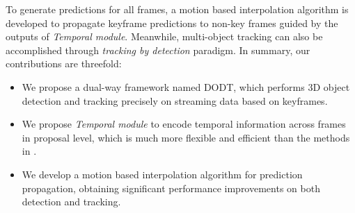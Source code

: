 \documentclass[letterpaper, 10pt, conference]{ieeeconf}  %
\def\figurename{\emph{Figure}}
\begin{document}

To generate predictions for all frames, a motion based interpolation algorithm is developed to propagate keyframe predictions to non-key frames guided by the outputs of \textit{Temporal module}. Meanwhile, multi-object tracking can also be accomplished through \textit{tracking by detection} \cite{lenz2015followme} paradigm. In summary, our contributions are threefold:
\begin{itemize}
	\item We propose a dual-way framework named DODT,  which performs 3D object detection and tracking precisely on streaming data based on keyframes.
	\item We propose \textit{Temporal module} to encode temporal information across frames in proposal level, which is much more flexible and efficient than the methods in \cite{feichtenhofer2017detect, dosovitskiy2015flownet}.
	\item We develop a motion based interpolation algorithm for prediction propagation, obtaining significant performance improvements on both detection and tracking.  
\end{itemize}

\end{document}
